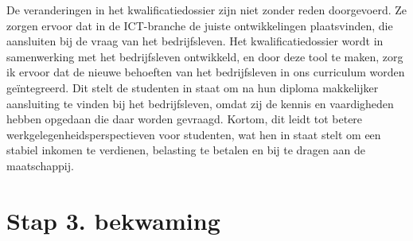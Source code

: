 De veranderingen in het kwalificatiedossier zijn niet zonder reden doorgevoerd. Ze zorgen ervoor dat in de ICT-branche de juiste ontwikkelingen plaatsvinden, die aansluiten bij de vraag van het bedrijfsleven. Het kwalificatiedossier wordt in samenwerking met het bedrijfsleven ontwikkeld, en door deze tool te maken, zorg ik ervoor dat de nieuwe behoeften van het bedrijfsleven in ons curriculum worden geïntegreerd. Dit stelt de studenten in staat om na hun diploma makkelijker aansluiting te vinden bij het bedrijfsleven, omdat zij de kennis en vaardigheden hebben opgedaan die daar worden gevraagd. Kortom, dit leidt tot betere werkgelegenheidsperspectieven voor studenten, wat hen in staat stelt om een stabiel inkomen te verdienen, belasting te betalen en bij te dragen aan de maatschappij.

\section{Stap 3. bekwaming}
